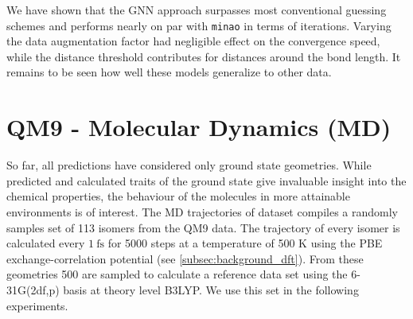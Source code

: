 We have shown that the GNN approach surpasses most conventional guessing schemes and performs nearly on par with \texttt{minao} in terms of iterations. Varying the data augmentation factor had negligible effect on the convergence speed, while the distance threshold contributes for distances around the bond length. It remains to be seen how well these models generalize to other data. 

\section{QM9 -  Molecular Dynamics (MD)}
\label{sec:qm9_md_isomers_benchmark}
So far, all predictions have considered only ground state geometries. While predicted and calculated traits of the ground state give invaluable insight into the chemical properties, the behaviour of the molecules in more attainable environments is of interest. The MD trajectories of  dataset \parencite{ref:qm9_isomers_md} compiles a randomly samples set of 113 isomers from the QM9  data. The trajectory of every isomer is calculated every $\SI{1}{\femto\second}$ for 5000 steps at a temperature of 500 K using the PBE exchange-correlation potential (see \ref{subsec:background_dft}). From these geometries 500 are sampled to calculate a reference data set using the 6-31G(2df,p) basis at theory level B3LYP. We use this set in the following experiments. 

